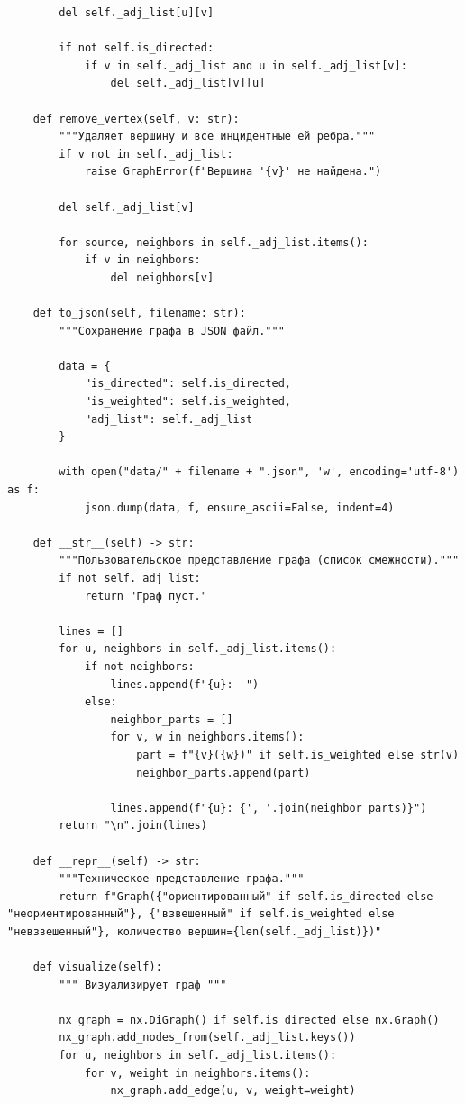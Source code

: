 \documentclass[referat]{SCWorks}
\begin{document}
\begin{verbatim}
        del self._adj_list[u][v]

        if not self.is_directed:
            if v in self._adj_list and u in self._adj_list[v]:
                del self._adj_list[v][u]

    def remove_vertex(self, v: str):
        """Удаляет вершину и все инцидентные ей ребра."""
        if v not in self._adj_list:
            raise GraphError(f"Вершина '{v}' не найдена.")

        del self._adj_list[v]

        for source, neighbors in self._adj_list.items():
            if v in neighbors:
                del neighbors[v]

    def to_json(self, filename: str):
        """Сохранение графа в JSON файл."""

        data = {
            "is_directed": self.is_directed,
            "is_weighted": self.is_weighted,
            "adj_list": self._adj_list
        }

        with open("data/" + filename + ".json", 'w', encoding='utf-8') as f:
            json.dump(data, f, ensure_ascii=False, indent=4)

    def __str__(self) -> str:
        """Пользовательское представление графа (список смежности)."""
        if not self._adj_list:
            return "Граф пуст."

        lines = []
        for u, neighbors in self._adj_list.items():
            if not neighbors:
                lines.append(f"{u}: -")
            else:
                neighbor_parts = []
                for v, w in neighbors.items():
                    part = f"{v}({w})" if self.is_weighted else str(v)
                    neighbor_parts.append(part)

                lines.append(f"{u}: {', '.join(neighbor_parts)}")
        return "\n".join(lines)

    def __repr__(self) -> str:
        """Техническое представление графа."""
        return f"Graph({"ориентированный" if self.is_directed else "неориентированный"}, {"взвешенный" if self.is_weighted else "невзвешенный"}, количество вершин={len(self._adj_list)})"

    def visualize(self):
        """ Визуализирует граф """

        nx_graph = nx.DiGraph() if self.is_directed else nx.Graph()
        nx_graph.add_nodes_from(self._adj_list.keys())
        for u, neighbors in self._adj_list.items():
            for v, weight in neighbors.items():
                nx_graph.add_edge(u, v, weight=weight)


\end{verbatim}
\end{document}
